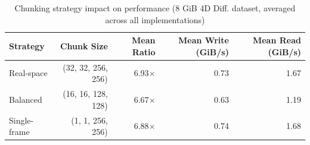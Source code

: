 \begin{table}[h]
\centering
\caption{Chunking strategy impact on performance (8 GiB 4D Diff. dataset, averaged across all implementations)}
\label{tab:chunking_summary}
\begin{tabular}{lrrrr}
\hline
Strategy & Chunk Size & Mean Ratio & Mean Write (GiB/s) & Mean Read (GiB/s) \\
\hline
Real-space & (32, 32, 256, 256) & 6.93$\times$ & 0.73 & 1.67 \\
Balanced & (16, 16, 128, 128) & 6.67$\times$ & 0.63 & 1.19 \\
Single-frame & (1, 1, 256, 256) & 6.88$\times$ & 0.74 & 1.68 \\
\hline
\end{tabular}
\end{table}
